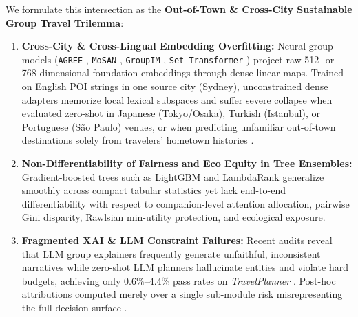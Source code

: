\documentclass[final,5p,twocolumn]{elsarticle}
\begin{document}
We formulate this intersection as the \textbf{Out-of-Town \& Cross-City Sustainable Group Travel Trilemma}:
\begin{enumerate}
    \item \textbf{Cross-City \& Cross-Lingual Embedding Overfitting:} Neural group models (\texttt{AGREE} \cite{cao2018attentive}, \texttt{MoSAN} \cite{tran2019mosan}, \texttt{GroupIM} \cite{sankar2020groupim}, \texttt{Set-Transformer} \cite{lee2019settransformer}) project raw 512- or 768-dimensional foundation embeddings through dense linear maps. Trained on English POI strings in one source city (Sydney), unconstrained dense adapters memorize local lexical subspaces and suffer severe collapse when evaluated zero-shot in Japanese (Tokyo/Osaka), Turkish (Istanbul), or Portuguese (S\~{a}o Paulo) venues, or when predicting unfamiliar out-of-town destinations solely from travelers' hometown histories \cite{wongso2025massivesteps,li2026tripworld}.
    \item \textbf{Non-Differentiability of Fairness and Eco Equity in Tree Ensembles:} Gradient-boosted trees such as LightGBM \cite{ke2017lightgbm} and LambdaRank generalize smoothly across compact tabular statistics yet lack end-to-end differentiability with respect to companion-level attention allocation, pairwise Gini disparity, Rawlsian min-utility protection, and ecological exposure.
    \item \textbf{Fragmented XAI \& LLM Constraint Failures:} Recent audits reveal that LLM group explainers frequently generate unfaithful, inconsistent narratives \cite{waterschoot2026consistent,tommasel2024fairness} while zero-shot LLM planners hallucinate entities and violate hard budgets, achieving only $0.6\%$--$4.4\%$ pass rates on \textit{TravelPlanner} \cite{xie2024travelplanner}. Post-hoc attributions computed merely over a single sub-module risk misrepresenting the full decision surface \cite{sundararajan2017axiomatic,deyoung2020eraser}.
\end{enumerate}
\end{document}
